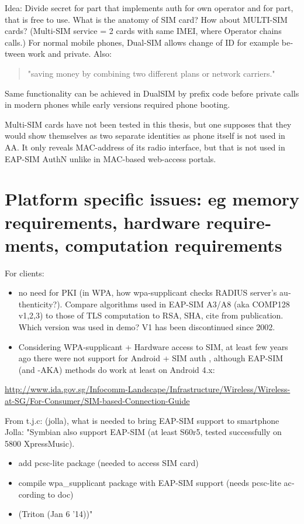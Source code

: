 \documentclass[12pt,a4paper,english]{tutthesis}
\begin{document}
\begin{otherlanguage}{english}
Idea: Divide secret for part that implements auth for own operator and
for part, that is free to use. What is the anatomy of SIM card?  How
about MULTI-SIM cards? (Multi-SIM service = 2 cards with same IMEI,
where Operator chains calls.)  For normal mobile phones, Dual-SIM
allows change of ID for example between work and private. Also:
\begin{quote}
"saving money by combining two different plans or  network carriers." 
\end{quote}

Same functionality can be achieved in DualSIM by prefix code before
private calls in modern phones while early versions required 
phone booting.

Multi-SIM cards have not been tested in this thesis, but one supposes
that they would show themselves as two separate identities as 
phone itself is not used in AA. It only reveals  MAC-address of its
radio interface, but that is not used in EAP-SIM AuthN unlike in MAC-based web-access portals.


\section{Platform specific issues: eg memory requirements, hardware requirements, computation requirements}
\label{sec-6-3}

For clients: 
\begin{itemize}
\item no need for PKI (in WPA, how wpa-supplicant checks RADIUS server's
authenticity?). Compare algorithms used in EAP-SIM A3/A8 (aka
COMP128 v1,2,3) to those of
TLS computation to RSA, SHA, cite from publication.
Which version was used in demo? V1 has been discontinued since 2002.

\item Considering WPA-supplicant + Hardware access to SIM,
at least few years ago there were not support for Android + SIM
auth \cite{android-sim}, although EAP-SIM (and -AKA) methods do
work at least on Android 4.x:
\end{itemize}
\url{http://www.ida.gov.sg/Infocomm-Landscape/Infrastructure/Wireless/Wireless-at-SG/For-Consumer/SIM-based-Connection-Guide}


From t.j.c: (jolla), what is needed to bring EAP-SIM support
to smartphone Jolla:
"Symbian also support EAP-SIM (at least S60r5, tested successfully on 5800 XpressMusic).

\begin{itemize}
\item add pcsc-lite package (needed to access SIM card)
\item compile wpa\_supplicant package with EAP-SIM support (needs pcsc-lite according to doc)
\item{}
(Triton (Jan 6 '14))"
\end{itemize}


\end{otherlanguage}
\end{document}
